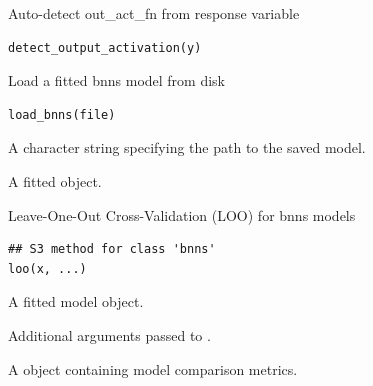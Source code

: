 \documentclass[a4paper]{book}
\begin{document}
%
\begin{Description}
Auto-detect out\_act\_fn from response variable
\end{Description}
%
\begin{Usage}
\begin{verbatim}
detect_output_activation(y)
\end{verbatim}
\end{Usage}
%
\begin{Description}
Load a fitted bnns model from disk
\end{Description}
%
\begin{Usage}
\begin{verbatim}
load_bnns(file)
\end{verbatim}
\end{Usage}
%
\begin{Arguments}
\begin{ldescription}
\item[\code{file}] A character string specifying the path to the saved model.
\end{ldescription}
\end{Arguments}
%
\begin{Value}
A fitted  object.
\end{Value}
%
\begin{Description}
Leave-One-Out Cross-Validation (LOO) for bnns models
\end{Description}
%
\begin{Usage}
\begin{verbatim}
## S3 method for class 'bnns'
loo(x, ...)
\end{verbatim}
\end{Usage}
%
\begin{Arguments}
\begin{ldescription}
\item[\code{x}] A fitted  model object.

\item[\code{...}] Additional arguments passed to .
\end{ldescription}
\end{Arguments}
%
\begin{Value}
A  object containing model comparison metrics.
\end{Value}
\end{document}
